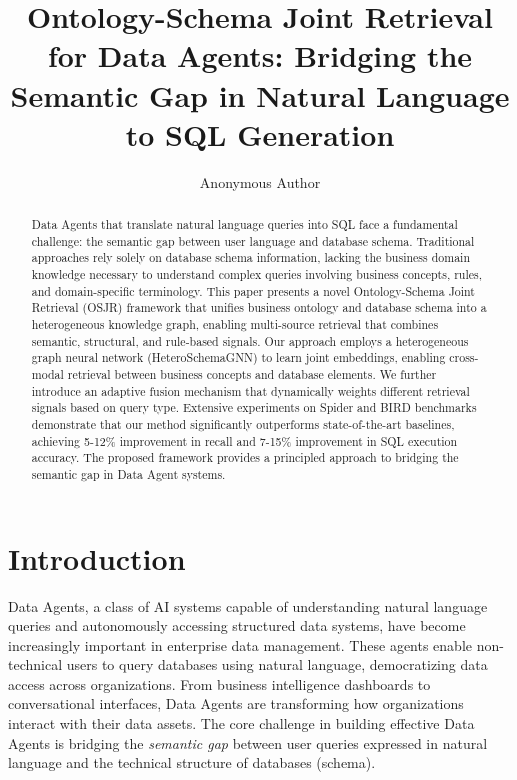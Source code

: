 \documentclass[sigconf, nonatbib]{acmart}
\begin{document}
\title{Ontology-Schema Joint Retrieval for Data Agents: Bridging the Semantic Gap in Natural Language to SQL Generation}

\author{Anonymous Author}

\begin{abstract}
Data Agents that translate natural language queries into SQL face a fundamental challenge: the semantic gap between user language and database schema. Traditional approaches rely solely on database schema information, lacking the business domain knowledge necessary to understand complex queries involving business concepts, rules, and domain-specific terminology. This paper presents a novel Ontology-Schema Joint Retrieval (OSJR) framework that unifies business ontology and database schema into a heterogeneous knowledge graph, enabling multi-source retrieval that combines semantic, structural, and rule-based signals. Our approach employs a heterogeneous graph neural network (HeteroSchemaGNN) to learn joint embeddings, enabling cross-modal retrieval between business concepts and database elements. We further introduce an adaptive fusion mechanism that dynamically weights different retrieval signals based on query type. Extensive experiments on Spider and BIRD benchmarks demonstrate that our method significantly outperforms state-of-the-art baselines, achieving 5-12\% improvement in recall and 7-15\% improvement in SQL execution accuracy. The proposed framework provides a principled approach to bridging the semantic gap in Data Agent systems.
\end{abstract}


\maketitle

\section{Introduction}

Data Agents, a class of AI systems capable of understanding natural language queries and autonomously accessing structured data systems, have become increasingly important in enterprise data management. These agents enable non-technical users to query databases using natural language, democratizing data access across organizations. From business intelligence dashboards to conversational interfaces, Data Agents are transforming how organizations interact with their data assets. The core challenge in building effective Data Agents is bridging the \textit{semantic gap} between user queries expressed in natural language and the technical structure of databases (schema).
\end{document}
